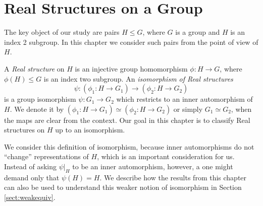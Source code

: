 \chapter{Real Structures on a Group}\label{chapter:realstructures}

The key object of our study are pairs $H\leq G$, where $G$ is a group and $H$ is an index 2 subgroup. In this chapter we consider such pairs from the point of view of $H$.

A \emph{Real structure} on $H$ is an injective group homomorphism $\phi \colon H \rightarrow G$,
where $\phi(H) \leq {G}$ is an index two subgroup.
An \emph{isomorphism of Real structures} 
    \[
        \psi \colon (\phi_1 \colon H \rightarrow {G}_1) \rightarrow (\phi_2 \colon H \rightarrow {G}_2)
    \]
    is a group isomorphism $\psi \colon {G}_1 \rightarrow {G}_2$ which restricts to an inner automorphism of $H$.
    We denote it by $(\phi_1 \colon H \rightarrow {G}_1) \simeq (\phi_2 \colon H \rightarrow {G}_2)$
    or simply ${G}_1 \simeq {G}_2$, when the maps are clear from the context. 
Our goal in this chapter is to classify Real structures on $H$ up to an isomorphism.    

We consider this definition of isomorphism, because inner automorphisms do not ``change'' representations of $H$, which is an important consideration for us. Instead of asking $\psi|_H$ to be an inner automorphism, however, a one might demand only that $\psi (H) = H$. We describe how the results from this chapter can also be used to understand this weaker notion of isomorphism in Section \ref{sect:weakequiv}.

